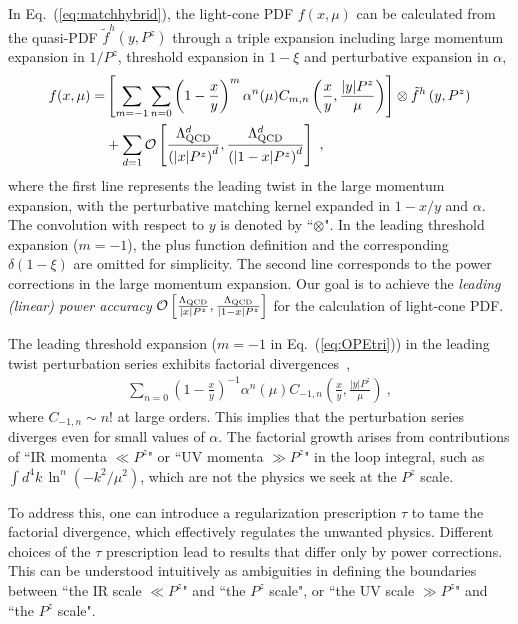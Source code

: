 \documentclass[a4paper,11pt]{article}
\begin{document}
In Eq.~(\ref{eq:matchhybrid}), the light-cone PDF $f(x,\mu)$ can be calculated from the quasi-PDF $\tilde f^{h}(y,P^z)$ through a triple expansion including large momentum expansion in $1/P^z$, threshold expansion in $1-\xi$ and perturbative expansion in $\alpha$,
\begin{align}\label{eq:OPEtri}
    f(x,\mu) = &\left[ \sum_{m=-1} \sum_{n=0} \left(1-\frac{x}{y}\right)^{m} \alpha^n(\mu) C_{m,n}\left( \frac{x}{y}, \frac{|y| P^z}{\mu} \right) \right] \otimes \tilde f^{h} \left(y, P^z\right) \nonumber\\
    & + \sum_{d=1} \mathcal{O}\left[ \frac{\Lambda_{\rm QCD}^d}{\left(|x| P^z\right)^d}, \frac{\Lambda_{\rm QCD}^d}{\left(|1-x| P^z\right)^d} \right] \ ,
\end{align}
where the first line represents the leading twist in the large momentum expansion, with the perturbative matching kernel expanded in $1-x/y$ and $\alpha$. The convolution with respect to $y$ is denoted by ``$\otimes$". In the leading threshold expansion ($m=-1$), the plus function definition and the corresponding $\delta(1-\xi)$ are omitted for simplicity. The second line corresponds to the power corrections in the large momentum expansion. Our goal is to achieve the {\it leading (linear) power accuracy} $\mathcal{O}\left[ \frac{\Lambda_{\rm QCD}}{|x| P^z}, \frac{\Lambda_{\rm QCD}}{|1-x| P^z} \right]$ for the calculation of light-cone PDF.

The leading threshold expansion ($m=-1$ in Eq.~(\ref{eq:OPEtri})) in the leading twist perturbation series exhibits factorial divergences~\cite{Beneke:1994sw, Beneke:1998ui, Beneke:2000kc,Shifman:2013uka},
\begin{align}
\sum_{n=0} \left(1-\frac{x}{y}\right)^{-1} \alpha^n(\mu) C_{-1,n}\left( \frac{x}{y}, \frac{|y| P^z}{\mu} \right) \ , 
\end{align}
where $C_{-1,n} \sim n!$ at large orders. This implies that the perturbation series diverges even for small values of $\alpha$. The factorial growth arises from contributions of ``IR momenta $\ll P^z$" or ``UV momenta $\gg P^z$" in the loop integral, such as $\int d^4 k \, \ln^n\left(-k^2/\mu^2\right)$, which are not the physics we seek at the $P^z$ scale. 

To address this, one can introduce a regularization prescription $\tau$ to tame the factorial divergence, which effectively regulates the unwanted physics. Different choices of the $\tau$ prescription lead to results that differ only by power corrections. This can be understood intuitively as ambiguities in defining the boundaries between ``the IR scale $\ll P^z$" and ``the $P^z$ scale", or ``the UV scale $\gg P^z$" and ``the $P^z$ scale". 
\end{document}
